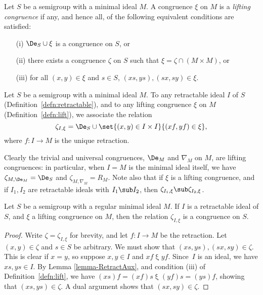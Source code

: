 \newpage

\begin{definition}\label{defn:lift}
Let $S$ be a semigroup with a minimal ideal $M$.  A congruence $\xi$ on $M$ is a \emph{lifting congruence} if any, and hence all, of the following equivalent conditions are satisfied:
\begin{itemize}
\item[(i)] $\De_S\cup\xi$ is a congruence on $S$, or
\item[(ii)] there exists a congruence $\zeta$ on $S$ such that $\xi=\zeta\cap(M\times M)$, or
\item[(iii)] for all $(x,y)\in\xi$ and $s\in S$, $(xs,ys),(sx,sy)\in\xi$.
\end{itemize}
\end{definition}

\begin{definition}\label{defn:lift2}
Let $S$ be a semigroup with a minimal ideal $M$.  To any retractable ideal $I$ of $S$ (Definition~\ref{defn:retractable}), and to any lifting congruence $\xi$ on $M$ (Definition~\ref{defn:lift}), we
associate the relation
\[
  \zeta_{I,\xi}=\De_S\cup\set{(x,y)\in I\times I}{(xf,yf) \in \xi},
\]
where $f:I\to M$ is the unique retraction.
\end{definition}

Clearly the trivial and universal congruences, $\De_M$ and $\nabla_M$ on $M$, are lifting congruences: in particular, when $I=M$ is the minimal ideal itself, we have $\zeta_{M,\De_M} = \De_S$ and $\zeta_{M,\nabla_M}=R_M$.  Note also that if $\xi$ is a lifting congruence, and if $I_1,I_2$ are retractable ideals with $I_1\sub I_2$, then $\zeta_{I_1,\xi}\sub\zeta_{I_2,\xi}$.

\begin{proposition}\label{prop:lift}
Let $S$ be a semigroup with a regular minimal ideal $M$.  If $I$ is a retractable ideal of $S$, and $\xi$ a lifting congruence on $M$, then the relation $\zeta_{I,\xi}$ is a congruence on $S$.
\end{proposition}

\begin{proof} Write $\zeta=\zeta_{I,\xi}$ for brevity, and let $f:I\to M$ be the retraction.  Let $(x,y)\in\zeta$ and $s\in S$ be
arbitrary.  We must show that $(xs,ys),(sx,sy)\in\zeta$.  This is clear if
$x=y$, so suppose $x,y\in I$ and $xf\mathrel\xi yf$.  Since~$I$ is an
ideal, we have $xs,ys\in I$.  By Lemma \ref{lemma-RetractAux}, and condition (iii) of Definition~\ref{defn:lift}, we have $(xs)f = (xf)s \mathrel\xi
(yf)s = (ys)f$, showing that $(xs,ys)\in\zeta$.  A dual argument shows that
$(sx,sy)\in\zeta$. 
\end{proof}

